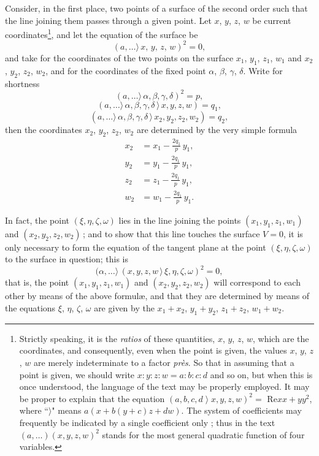 \documentclass[11pt,a4paper]{book}
\begin{document}
Consider, in the first place, two points of a surface of the second order such that
the line joining them passes through a given point. Let $x$, $y$, $z$, $w$ be current
coordinates\footnote{Strictly speaking, it is the \textit{ratios} of these quantities, $x$, $y$, $z$, $w$, which are the coordinates, and consequently, even when the point is given, the values $x$, $y$, $z$, $w$ are merely indeterminate to a factor \textit{pr\`es}. So that in assuming that a point is given, we should write $x:y:z:w=a:b:c:d$ and so on, but when this is once understood, the language of the text may be properly employed. It may be proper to explain that the equation $(a, b, c, d \;\rangle\; x, y, z, w)^2 = $ Re$xx+yy^2$, where ``$\rangle$" means $a(x+b(y+c)z+dw)$. The system of coefficients may frequently be indicated by a single coefficient only ; thus in the text $(a,\ldots\!)(x,y,z,w)^2$ stands for the most general quadratic function of four variables.}, and let the equation of the surface be
\[
(a,\ldots\!\rangle\,x,\,y,\,z,\,w)^2 = 0,
\]
and take for the coordinates of the two points on the surface $x_1$, $y_1$, $z_1$, $w_1$ and
$x_2$, $y_2$, $z_2$, $w_2$, and for the coordinates of the fixed point $\alpha$, $\beta$, $\gamma$, $\delta$. Write for shortness
\[
(a,\ldots\!\rangle\,\alpha, \beta, \gamma, \delta)^2 = p,
\]
\[
(a,\ldots\!\rangle\,\alpha, \beta, \gamma, \delta\,\rangle\,x, y, z, w) = q_1,
\]
\[
(a,\ldots\!\rangle\,\alpha, \beta, \gamma, \delta\,\rangle\,x_2, y_2, z_2, w_2) = q_2,
\]
then the coordinates $x_2$, $y_2$, $z_2$, $w_2$ are determined by the very simple formula
\begin{align*}
x_2 &= x_1 - \frac{2 q_1}{p}\,y_1, \\
y_2 &= y_1 - \frac{2 q_1}{p}\,y_1, \\
z_2 &= z_1 - \frac{2 q_1}{p}\,y_1, \\
w_2 &= w_1 - \frac{2 q_1}{p}\,y_1.
\end{align*}

\medskip

In fact, the point $(\xi,\eta,\zeta,\omega)$ lies in the line joining the points $(x_1, y_1, z_1, w_1)$ and
$(x_2, y_2, z_2, w_2)$\,; and to show that this line touches the surface $V=0$, it is only
necessary to form the equation of the tangent plane at the point $(\xi,\eta,\zeta,\omega)$ to the
surface in question; this is
\[
(\alpha,\ldots\!\rangle\,(x, y, z, w\,\rangle\,\xi, \eta, \zeta, \omega)^2 = 0,
\]
that is, the point $(x_1, y_1, z_1, w_1)$ and $(x_2, y_2, z_2, w_2)$ will correspond to each other by
means of the above formul\ae, and that they are determined by means of the equations $\xi$, $\eta$, $\zeta$, $\omega$ are given by the
$x_1 + x_2$, $y_1 + y_2$, $z_1 + z_2$, $w_1 + w_2$.
\end{document}
